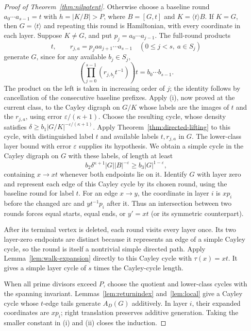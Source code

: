 \documentclass[11pt,a4paper,reqno]{amsart}
\theoremstyle{definition}
\theoremstyle{remark}
\numberwithin{equation}{section}
\newcommand{\gen}[1]{\langle #1\rangle}
\newcommand{\eps}{\varepsilon}
\begin{document}
\begin{proof}[Proof of Theorem~\ref{thm:nilpotent}]
Otherwise choose a baseline round $a_0\cdots a_{s-1}=t$ with $h=|K/B|>P$, where $B=[G,t]$ and $K=\gen tB$. If $K=G$, then $G=\gen t$ and repeating this round is Hamiltonian, with every coordinate in each layer. Suppose $K\ne G$, and put $p_j=a_0\cdots a_{j-1}$. The full-round products
\[
 t,\qquad r_{j,a}=p_j a a_{j+1}\cdots a_{s-1}
 \quad(0\le j<s,\ a\in S_j)
\]
generate $G$, since for any available $b_j\in S_j$,
\[
 \left(\prod_{j=0}^{s-1}(r_{j,b_j}t^{-1})\right)t
 =b_0\cdots b_{s-1}.
\]
The product on the left is taken in increasing order of $j$; the identity follows by cancellation of the consecutive baseline prefixes. Apply (i), now proved at the current class, to the Cayley digraph on $G/K$ whose labels are the images of $t$ and the $r_{j,a}$, using error $\eps/(\kappa+1)$. Choose the resulting cycle, whose density satisfies $\delta\ge b_1|G/K|^{-\eps/(\kappa+1)}$. Apply Theorem~\ref{thm:directed-lifting} to this cycle, with distinguished label $t$ and available labels $t,r_{j,a}$ in $G$. The lower-class layer bound with error $\eps$ supplies its hypothesis. We obtain a simple cycle in the Cayley digraph on $G$ with these labels, of length at least
\[
 b_2\delta^{\kappa+1}|G||B|^{-\eps}
 \ge b_3|G|^{1-\eps},
\]
containing $x\to xt$ whenever both endpoints lie on it. Identify $G$ with layer zero and represent each edge of this Cayley cycle by its chosen round, using the baseline round for label $t$. For an edge $x\to y$, the coordinate in layer $i$ is $xp_i$ before the changed arc and $yt^{-1}p_i$ after it. Thus an intersection between two rounds forces equal starts, equal ends, or $y'=xt$ (or its symmetric counterpart).

After its terminal vertex is deleted, each round visits every layer once. Its two layer-zero endpoints are distinct because it represents an edge of a simple Cayley cycle, so the round is itself a nontrivial simple directed path. Apply Lemma~\ref{lem:walk-expansion} directly to this Cayley cycle with $\tau(x)=xt$. It gives a simple layer cycle of $s$ times the Cayley-cycle length.

When all prime divisors exceed $P$, choose the quotient and lower-class cycles with the spanning invariant. Lemmas~\ref{lem:returnindex} and~\ref{lem:local} give a Cayley cycle whose $t$-edge tails generate $A_D(G)$ additively. In layer $i$, their expanded coordinates are $xp_i$; right translation preserves additive generation. Taking the smaller constant in (i) and (ii) closes the induction.
\end{proof}
\end{document}
